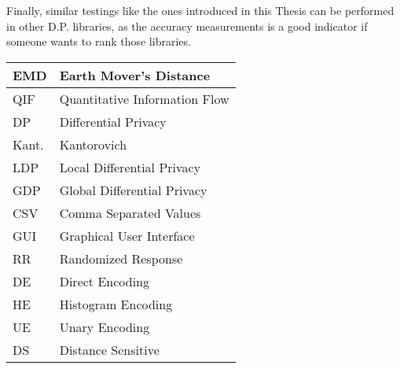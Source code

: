\documentclass[inscr]{dithesis}
\begin{document}
Finally, similar testings like the ones introduced in this Thesis can be performed in other D.P. libraries, as the accuracy measurements is a good indicator if someone wants to rank those libraries.


\backmatter

\abbreviations
\begin{center}
	\renewcommand{\arraystretch}{1.5}
	\begin{longtable}{| l | @{\qquad} l |}
	\hline
	EMD & Earth Mover's Distance \\
  \hline
    QIF & Quantitative Information Flow \\
  \hline
	DP & Differential Privacy\\
  \hline
	Kant. & Kantorovich \\
  \hline
  LDP & Local Differential Privacy\\
  \hline
  GDP & Global Differential Privacy\\
  \hline
  CSV & Comma Separated Values\\
  \hline
  GUI & Graphical User Interface\\
  \hline
  RR & Randomized Response\\
  \hline
  DE & Direct Encoding\\
  \hline
  HE & Histogram Encoding\\
  \hline
  UE & Unary Encoding\\
  \hline
  DS & Distance Sensitive\\
  \hline
	\end{longtable}
\end{center}
\end{document}
